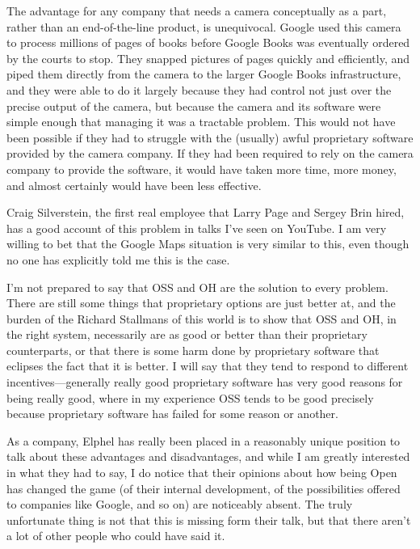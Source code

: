 \documentclass[a4paper]{article}
\begin{document}
The advantage for any company that needs a camera conceptually as a part, rather than an end-of-the-line product, is unequivocal. Google used this camera to process millions of pages of books before Google Books was eventually ordered by the courts to stop. They snapped pictures of pages quickly and efficiently, and piped them directly from the camera to the larger Google Books infrastructure, and they were able to do it largely because they had control not just over the precise output of the camera, but because the camera and its software were simple enough that managing it was a tractable problem. This would not have been possible if they had to struggle with the (usually) awful proprietary software provided by the camera company. If they had been required to rely on the camera company to provide the software, it would have taken more time, more money, and almost certainly would have been less effective.

Craig Silverstein, the first real employee that Larry Page and Sergey Brin hired, has a good account of this problem in talks I've seen on YouTube. I am very willing to bet that the Google Maps situation is very similar to this, even though no one has explicitly told me this is the case.

I'm not prepared to say that OSS and OH are the solution to every problem. There are still some things that proprietary options are just better at, and the burden of the Richard Stallmans of this world is to show that OSS and OH, in the right system, necessarily are as good or better than their proprietary counterparts, or that there is some harm done by proprietary software that eclipses the fact that it is better. I will say that they tend to respond to different incentives---generally really good proprietary software has very good reasons for being really good, where in my experience OSS tends to be good precisely because proprietary software has failed for some reason or another.

As a company, Elphel has really been placed in a reasonably unique position to talk about these advantages and disadvantages, and while I am greatly interested in what they had to say, I do notice that their opinions about how being Open has changed the game (of their internal development, of the possibilities offered to companies like Google, and so on) are noticeably absent. The truly unfortunate thing is not that this is missing form their talk, but that there aren't a lot of other people who could have said it.
\end{document}

